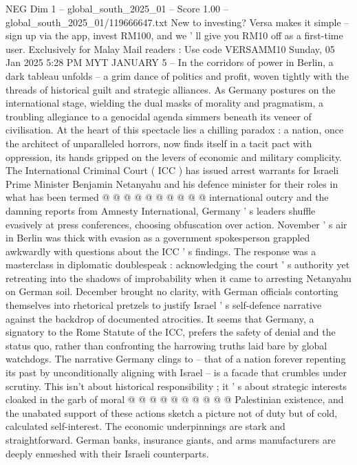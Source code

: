 \begin{textsample}{NEG Dim 1 – global\_south\_2025\_01 – Score 1.00 – global\_south\_2025\_01/119666647.txt}  \label{ex:f1_neg_153}
New to investing?
Versa makes it simple -- sign up via the app, invest RM100, and we ' ll give you RM10 off as a first-time user.
Exclusively for Malay Mail readers : Use code VERSAMM10 Sunday, 05 Jan 2025 5:28 PM MYT JANUARY 5 -- In the corridors of power in Berlin, a dark tableau unfolds -- a grim dance of politics and profit, woven tightly with the threads of historical guilt and strategic alliances.
As Germany postures on the international stage, wielding the dual masks of morality and pragmatism, a troubling allegiance to a genocidal agenda simmers beneath its veneer of civilisation.
At the heart of this spectacle lies a chilling paradox : a nation, once the architect of unparalleled horrors, now finds itself in a tacit pact with oppression, its hands gripped on the levers of economic and military complicity.
The International Criminal Court ( ICC ) has issued arrest warrants for Israeli Prime Minister Benjamin Netanyahu and his defence minister for their roles in what has been termed @ @ @ @ @ @ @ @ @ @ international outcry and the damning reports from Amnesty International, Germany ' s leaders shuffle evasively at press conferences, choosing obfuscation over action.
November ' s air in Berlin was thick with evasion as a government spokesperson grappled awkwardly with questions about the ICC ' s findings.
The response was a masterclass in diplomatic doublespeak : acknowledging the court ' s authority yet retreating into the shadows of improbability when it came to arresting Netanyahu on German soil.
December brought no clarity, with German officials contorting themselves into rhetorical pretzels to justify Israel ' s self-defence narrative against the backdrop of documented atrocities.
It seems that Germany, a signatory to the Rome Statute of the ICC, prefers the safety of denial and the status quo, rather than confronting the harrowing truths laid bare by global watchdogs.
The narrative Germany clings to -- that of a nation forever repenting its past by unconditionally aligning with Israel -- is a facade that crumbles under scrutiny.
This isn't about historical responsibility ; it ' s about strategic interests cloaked in the garb of moral @ @ @ @ @ @ @ @ @ @ Palestinian existence, and the unabated support of these actions sketch a picture not of duty but of cold, calculated self-interest.
The economic underpinnings are stark and straightforward.
German banks, insurance giants, and arms manufacturers are deeply enmeshed with their Israeli counterparts.

\end{textsample}
